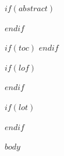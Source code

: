 \documentclass[
$if(fontsize)$
  $fontsize$,
$else$
  11pt,
$endif$
$if(papersize)$
  $papersize$paper,
$else$
  a4paper,
$endif$
$for(classoption)$
  $classoption$$sep$,
$endfor$
]{$if(documentclass)$$documentclass$$else$report$endif$}
\numberwithin{equation}{section}
\numberwithin{table}{section}
\numberwithin{figure}{section}
\begin{document}
\setcounter{page}{1}

$if(abstract)$
\begin{abstract}
$abstract$
\end{abstract}
\newpage
$endif$

$if(toc)$
\setcounter{tocdepth}{$if(toc-depth)$$toc-depth$$else$2$endif$}
\tableofcontents
\newpage
$endif$

$if(lof)$
\listoffigures
\newpage
$endif$

$if(lot)$
\listoftables
\newpage
$endif$

$body$
\end{document}
